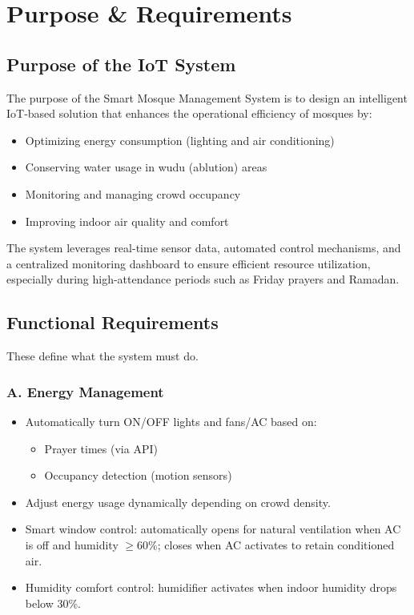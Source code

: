 \section{Purpose \& Requirements}

\subsection{Purpose of the IoT System}
The purpose of the Smart Mosque Management System is to design an intelligent IoT-based solution that enhances the operational efficiency of mosques by:
\begin{itemize}
  \item Optimizing energy consumption (lighting and air conditioning)
  \item Conserving water usage in wudu (ablution) areas
  \item Monitoring and managing crowd occupancy
  \item Improving indoor air quality and comfort
\end{itemize}

The system leverages real-time sensor data, automated control mechanisms, and a centralized monitoring dashboard to ensure efficient resource utilization, especially during high-attendance periods such as Friday prayers and Ramadan.

\subsection{Functional Requirements}
These define what the system must do.

\subsubsection*{A. Energy Management}
\begin{itemize}
  \item Automatically turn ON/OFF lights and fans/AC based on:
  \begin{itemize}
    \item Prayer times (via API)
    \item Occupancy detection (motion sensors)
  \end{itemize}
  \item Adjust energy usage dynamically depending on crowd density.
  \item Smart window control: automatically opens for natural ventilation when AC is off and humidity $\geq 60\%$; closes when AC activates to retain conditioned air.
  \item Humidity comfort control: humidifier activates when indoor humidity drops below 30\%.
\end{itemize}

